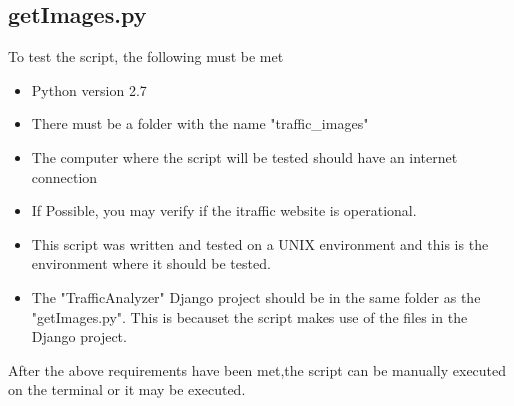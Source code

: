 \documentclass{article}
\begin{document}
\subsection{getImages.py}
To test the script, the following must be met
\begin{itemize}
\item Python version 2.7
\item There must be a folder with the name "traffic\_images"
\item The computer where the script will be tested should have an internet connection
\item If Possible, you may verify if the itraffic website is operational.
\item This script was written and tested on a UNIX environment and this is the environment where it should be tested.
\item The "TrafficAnalyzer" Django project should be in the same folder as the "getImages.py". This is becauset the script makes use of the files in the Django project.
\end{itemize}

After the above requirements have been met,the script can be manually executed on the terminal or it may be executed.
\end{document}
